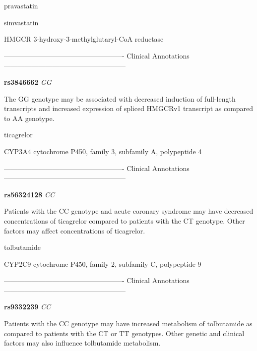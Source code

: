 \documentclass{resume} %
\begin{document}
\begin{rSection}{ pravastatin }
\end{rSection}\begin{rSection}{ simvastatin }
\item[]

\begin{rSubsection}{ HMGCR }{ 3-hydroxy-3-methylglutaryl-CoA reductase }{}{}
\item[]

\item[] ---------------------------------------------------- Clinical Annotations -----------------------------------------------------\newline
\item \textbf{ rs3846662 } \textit{ GG }
\item[] The GG genotype may be associated with decreased induction of full-length transcripts and increased expression of spliced HMGCRv1 transcript  as compared to AA genotype.
\end{rSubsection}

\end{rSection}\begin{rSection}{ ticagrelor }
\item[]

\begin{rSubsection}{ CYP3A4 }{ cytochrome P450, family 3, subfamily A, polypeptide 4 }{}{}
\item[]

\item[] ---------------------------------------------------- Clinical Annotations -----------------------------------------------------\newline
\item \textbf{ rs56324128 } \textit{ CC }
\item[] Patients with the CC genotype and acute coronary syndrome may have decreased concentrations of ticagrelor compared to patients with the CT genotype. Other factors may affect concentrations of ticagrelor.
\end{rSubsection}

\end{rSection}\begin{rSection}{ tolbutamide }
\item[]

\begin{rSubsection}{ CYP2C9 }{ cytochrome P450, family 2, subfamily C, polypeptide 9 }{}{}
\item[]

\item[] ---------------------------------------------------- Clinical Annotations -----------------------------------------------------\newline
\item \textbf{ rs9332239 } \textit{ CC }
\item[] Patients with the CC genotype may have increased metabolism of tolbutamide as compared to patients with the CT or TT genotypes. Other genetic and clinical factors may also influence tolbutamide metabolism.
\end{rSubsection}


\end{rSection}
\end{document}
